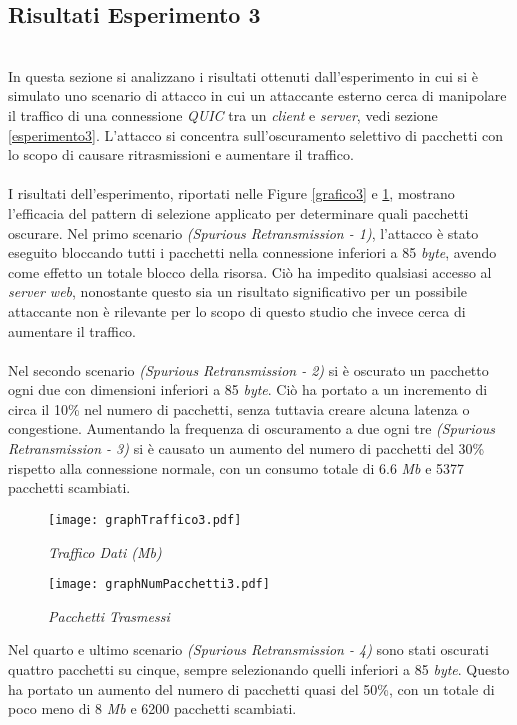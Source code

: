 \subsection{Risultati Esperimento 3}
~\\
\indent In questa sezione si analizzano i risultati ottenuti dall’esperimento in cui si è simulato
uno scenario di attacco in cui un attaccante esterno cerca di manipolare il traffico di una connessione \emph{QUIC} tra un \emph{client} e \emph{server}, vedi sezione \ref{esperimento3}.
L'attacco si concentra sull'oscuramento selettivo di pacchetti con lo scopo di causare ritrasmissioni e aumentare il traffico.
\\\\
I risultati dell'esperimento, riportati nelle Figure \ref{grafico3} e \ref{grafico32}, mostrano l'efficacia del pattern di selezione applicato per determinare quali pacchetti oscurare. 
Nel primo scenario \emph{(Spurious Retransmission - 1)}, l'attacco è stato eseguito bloccando tutti i pacchetti nella connessione inferiori a 85 \emph{byte}, avendo come effetto un totale blocco della risorsa.
Ciò ha impedito qualsiasi accesso al \emph{server web}, nonostante questo sia un risultato significativo per un possibile attaccante non è rilevante per lo scopo di questo studio che invece cerca di aumentare il traffico.
\\\\
Nel secondo scenario \emph{(Spurious Retransmission - 2)} si è oscurato un pacchetto ogni due con dimensioni inferiori a 85 \emph{byte}. Ciò ha portato a un incremento di circa il 10\% nel numero di pacchetti, senza tuttavia creare alcuna latenza o congestione.
Aumentando la frequenza di oscuramento a due ogni tre \emph{(Spurious Retransmission - 3)} si è causato un aumento del numero di pacchetti del 30\% rispetto alla connessione normale, con un consumo totale di 6.6 \emph{Mb} e 5377 pacchetti scambiati.
\begin{figure}[ht]
    \centering
    \begin{minipage}{0.48\textwidth}
        \centering
        \texttt{[image: graphTraffico3.pdf]}
        \caption{\emph{Traffico Dati (Mb)}}
        \label{grafico3}
    \end{minipage}
    \hfill
    \begin{minipage}{0.48\textwidth}
        \centering 
        \texttt{[image: graphNumPacchetti3.pdf]}
        \caption{\emph{Pacchetti Trasmessi}}
        \label{grafico32}
    \end{minipage}
\end{figure}
Nel quarto e ultimo scenario \emph{(Spurious Retransmission - 4)} sono stati oscurati quattro pacchetti su cinque, sempre selezionando quelli inferiori a 85 \emph{byte}.
Questo ha portato un aumento del numero di pacchetti quasi del 50\%, con un totale di poco meno di 8 \emph{Mb} e 6200 pacchetti scambiati.